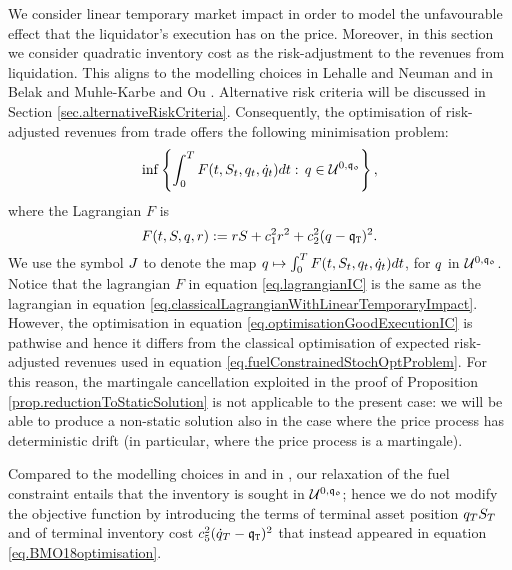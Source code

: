 \documentclass[10pt,a4paper]{article}
\begin{document}
We consider linear temporary market impact in order to model the unfavourable effect that the liquidator's execution has on the price. Moreover, in this section we consider quadratic inventory cost as the risk-adjustment to the revenues from liquidation. This aligns to the modelling choices in Lehalle and Neuman \cite{LN19inc} and in Belak and Muhle-Karbe and Ou \cite{BMO18opt}. Alternative risk criteria will be discussed in Section \ref{sec.alternativeRiskCriteria}. Consequently,  the optimisation of risk-adjusted revenues from trade  offers the following minimisation problem:
\begin{equation}\label{eq.optimisationGoodExecutionIC}
\inf \left\lbrace
\int_{0}^{T} F (t,S_t, q_t,\dot{q}_{t} )dt: \,  q \in \mathcal{U}^{0,\mathfrak{q_0}}
\right\rbrace,
\end{equation}
where the Lagrangian $F$ is 
\begin{equation}\label{eq.lagrangianIC}
F(t,S,q,r):= rS + c_{1}^{2} r^{2} +c_{2}^{2} (q-\mathfrak{q}_{\mathtt{T} })^{2}.
\end{equation}
We use the symbol $J$ to denote the map $q  \mapsto \int_{0}^{T} F (t,S_t, q_t,\dot{q}_{t} )dt$, for $q$ in $\mathcal{U}^{0,\mathfrak{q_0}}$. 
Notice that the lagrangian $F$ in equation \eqref{eq.lagrangianIC} is the same as the lagrangian in equation \eqref{eq.classicalLagrangianWithLinearTemporaryImpact}. However, the optimisation in equation \eqref{eq.optimisationGoodExecutionIC} is pathwise and hence it  differs from the classical optimisation of expected risk-adjusted revenues used in equation \eqref{eq.fuelConstrainedStochOptProblem}. For this reason, the martingale cancellation exploited in the proof of Proposition \ref{prop.reductionToStaticSolution} is not applicable to the  present case: we will be able to produce a non-static solution also in the case where the price process has deterministic drift (in particular, where the price process is a martingale). 


Compared to the modelling choices in \cite{LN19inc} and in \cite{BMO18opt}, our relaxation of the fuel constraint entails that the inventory is sought in $\mathcal{U}^{0,\mathfrak{q_0}}$; hence we do not modify the objective function by introducing the terms of terminal asset position $q_T S_T$ and of terminal inventory cost $c_{5} ^{2} (\dot{q}_T - \mathfrak{q}_{\mathtt{T} })^{2}$ that instead appeared in equation \eqref{eq.BMO18optimisation}.
\end{document}
